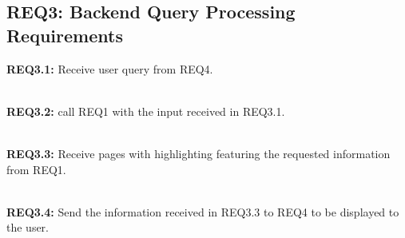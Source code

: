 \subsection{REQ3: Backend Query Processing Requirements}

\textbf{REQ3.1:} Receive user query from REQ4.\par

\textbf{\\REQ3.2:} call REQ1 with the input received in REQ3.1.\par

\textbf{\\REQ3.3:} Receive pages with highlighting featuring the requested information from REQ1.\par

\textbf{\\REQ3.4:} Send the information received in REQ3.3 to REQ4 to be displayed to the user.\par

